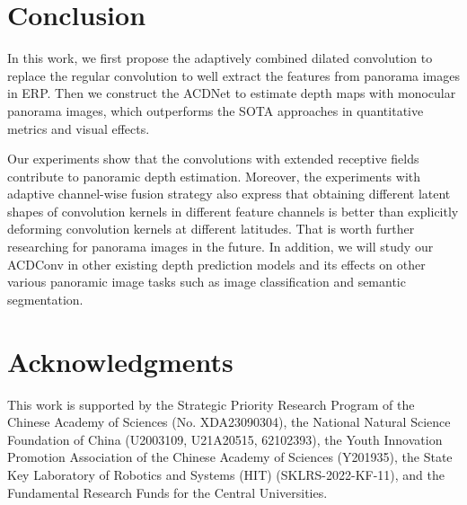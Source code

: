 \documentclass[letterpaper]{article} \usepackage{aaai21}  \usepackage{times}  \usepackage{helvet} \usepackage{courier}  \usepackage[hyphens]{url}  \usepackage{graphicx} \urlstyle{rm} \def\UrlFont{\rm}  \usepackage{natbib}  \usepackage{caption} \frenchspacing  \setlength{\pdfpagewidth}{8.5in}  \setlength{\pdfpageheight}{11in}
\newcommand{\newchange}[1]{{\color{black}#1}}
\begin{document}
\section{Conclusion}
In this work, we first propose the adaptively combined dilated convolution to replace the regular convolution to well extract the features from panorama images in ERP. Then we construct the ACDNet to estimate depth maps with monocular panorama images, which outperforms the SOTA approaches in quantitative metrics and visual effects. 

Our experiments show that the convolutions with extended receptive fields contribute to panoramic depth estimation. Moreover, the experiments with adaptive channel-wise fusion strategy also express that obtaining different latent shapes of convolution kernels in different feature channels is better than explicitly deforming convolution kernels at different latitudes. That is worth further researching for panorama images in the future.
\newchange{
In addition, we will study our ACDConv in other existing depth prediction models and its effects on other various panoramic image tasks such as image classification and semantic segmentation.
}
\section{Acknowledgments}

This work is supported by the Strategic Priority Research Program of the Chinese Academy of Sciences (No. XDA23090304), the National Natural Science Foundation of China (U2003109, U21A20515, 62102393), the Youth Innovation Promotion Association of the Chinese Academy of Sciences (Y201935), the State Key Laboratory of Robotics and Systems (HIT) (SKLRS-2022-KF-11), and the Fundamental Research Funds for the Central Universities.
 
\end{document}
